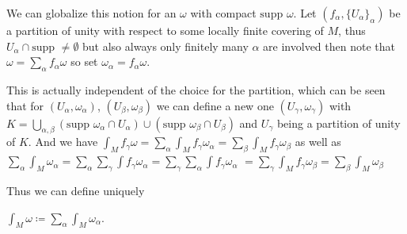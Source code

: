 We can globalize this notion for an \( \omega \) with compact \( \text{supp } \omega \). Let \( (f_\alpha, \{U_\alpha\}_{\alpha}) \) be a partition of unity 
with respect to some locally finite covering of \( M \), thus \( U_\alpha \cap \text{supp } \neq \emptyset \) but also always only finitely many \( \alpha \)
are involved then note that
\( \omega = \sum_\alpha f_\alpha \omega \)
so set \( \omega_\alpha = f_\alpha \omega \).

This is actually independent of the choice for the partition, which can be seen that for \( (U_\alpha, \omega_\alpha) \), \( (U_\beta, \omega_\beta) \)
we can define a new one \((U_\gamma, \omega_\gamma) \) with \( K = \bigcup_{\alpha, \beta} (\text{supp } \omega_\alpha \cap U_\alpha) \cup (\text{supp } \omega_\beta \cap U_\beta) \) and \( U_\gamma \) being a partition of unity of \( K \).
And we have
\( \int_M f_\gamma \omega = \sum_\alpha \int_M f_\gamma \omega_\alpha = \sum_\beta \int_M f_\gamma \omega_\beta \)
as well as
\( \sum_\alpha \int_M \omega_\alpha = \sum_\alpha \sum_\gamma \int f_\gamma \omega_\alpha = \sum_\gamma \sum_\alpha \int f_\gamma \omega_\alpha \)
\( = \sum_\gamma \int_M f_\gamma \omega_\beta = \sum_\beta \int_M \omega_\beta\)

Thus we can define uniquely

\( \int_M \omega \coloneqq \sum_\alpha \int_M \omega_\alpha \).

